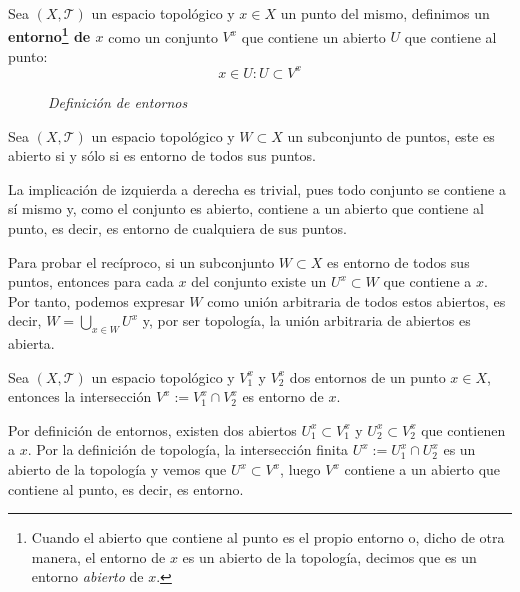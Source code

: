 \begin{defi}[Entorno]
Sea $(X, \mathcal{T})$ un espacio topológico y $x\in X$ un punto del mismo, definimos un \textbf{entorno\footnote{Cuando el abierto que contiene al punto es el propio entorno o, dicho de otra manera, el entorno de $x$ es un abierto de la topología, decimos que es un entorno \textit{abierto} de $x$.} de $x$} como un conjunto $V^x$ que contiene un abierto $U$ que contiene al punto:
\[
x \in U : U \subset V^x
\]
\end{defi}

\begin{figure}[H]
    \centering
    \caption{\textit{Definición de entornos}}
    \label{fig:definición-entornos}
\end{figure}

\begin{prop}
Sea $(X, \mathcal{T})$ un espacio topológico y $W \subset X$ un subconjunto de puntos, este es abierto si y sólo si es entorno de todos sus puntos.
\end{prop}
\begin{demo}
La implicación de izquierda a derecha es trivial, pues todo conjunto se contiene a sí mismo y, como el conjunto es abierto, contiene a un abierto que contiene al punto, es decir, es entorno de cualquiera de sus puntos.

Para probar el recíproco, si un subconjunto $W\subset X$ es entorno de todos sus puntos, entonces para cada $x$ del conjunto existe un $U^x\subset W$ que contiene a $x$. Por tanto, podemos expresar $W$ como unión arbitraria de todos estos abiertos, es decir, $W = \bigcup_{x\in W} U^x$ y, por ser topología, la unión arbitraria de abiertos es abierta.
\end{demo}

\begin{prop}
Sea $(X,\mathcal{T})$ un espacio topológico y $V_1^x$ y $V_2^x$ dos entornos de un punto $x\in X$, entonces la intersección $V^x := V_1^x\cap V_2^x$ es entorno de $x$.
\end{prop}
\begin{demo}
Por definición de entornos, existen dos abiertos $U_1^x\subset V_1^x$ y $U_2^x\subset V_2^x$ que contienen a $x$. Por la definición de topología, la intersección finita $U^x := U_1^x\cap U_2^x$ es un abierto de la topología y vemos que $U^x \subset V^x$, luego $V^x$ contiene a un abierto que contiene al punto, es decir, es entorno.
\end{demo}

